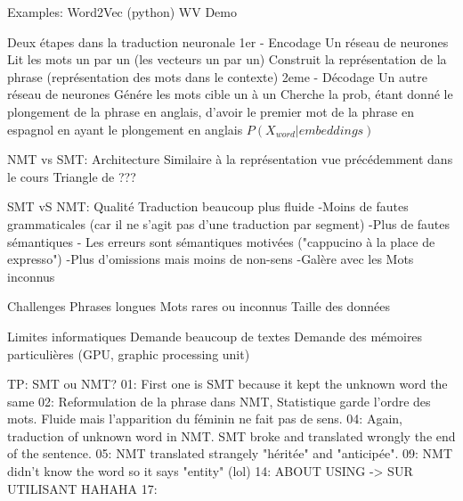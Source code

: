 Examples:
    Word2Vec (python)
    WV Demo

Deux étapes dans la traduction neuronale
    1er - Encodage
        Un réseau de neurones
        Lit les mots un par un (les vecteurs un par un)
        Construit la représentation de la phrase (représentation des mots dans le contexte)
    2eme - Décodage
        Un autre réseau de neurones
        Génére les mots cible un à un
        Cherche la prob, étant donné le plongement de la phrase en anglais, d'avoir le premier mot de la phrase en espagnol en ayant le plongement en anglais $P( X_{word} | embeddings)$

NMT vs SMT: Architecture
    Similaire à la représentation vue précédemment dans le cours
    Triangle de ???

SMT vS NMT: Qualité
    Traduction beaucoup plus fluide
        -Moins de fautes grammaticales (car il ne s'agit pas d'une traduction par segment)
        -Plus de fautes sémantiques
            - Les erreurs sont sémantiques motivées ("cappucino à la place de expresso")
        -Plus d'omissions mais moins de non-sens
        -Galère avec les Mots inconnus

Challenges
    Phrases longues
    Mots rares ou inconnus
    Taille des données

Limites informatiques
    Demande beaucoup de textes
    Demande des mémoires particulières (GPU, graphic processing unit)

TP: SMT ou NMT?
    01: First one is SMT because it kept the unknown word the same
    02: Reformulation de la phrase dans NMT, Statistique garde l'ordre des mots. Fluide mais l'apparition du féminin ne fait pas de sens.
    04: Again, traduction of unknown word in NMT. SMT broke and translated wrongly the end of the sentence.
    05: NMT translated strangely "héritée" and "anticipée".
    09: NMT didn't know the word so it says "entity" (lol)
    14: ABOUT USING -> SUR UTILISANT HAHAHA
    17:
